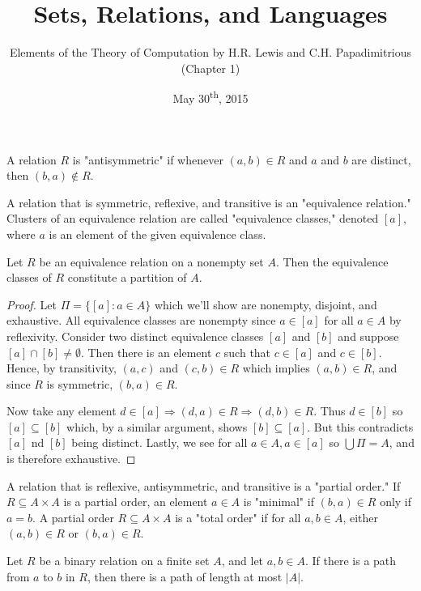 \documentclass[a4paper,11pt]{article}
\title{Sets, Relations, and Languages}
\author{Elements of the Theory of Computation by H.R. Lewis and C.H. Papadimitrious (Chapter 1)}
\date{May 30\textsuperscript{th}, 2015}
\begin{document}
\maketitle
{}

\begin{outline}

    A relation \(R\) is "antisymmetric" if whenever \((a,b)\in R\) and \(a\) and \(b\) are distinct, then
    \((b, a) \not\in R\).
    
    A relation that is symmetric, reflexive, and transitive is an "equivalence relation." Clusters of an
    equivalence relation are called "equivalence classes," denoted \([a]\), where \(a\) is an element of the
    given equivalence class.
    
    Let \(R\) be an equivalence relation on a nonempty set \(A\). Then the equivalence classes of \(R\) constitute
    a partition of \(A\).
    
    \begin{proof}
      Let \(\Pi = \{[a] : a \in A\}\) which we'll show are nonempty, disjoint, and exhaustive. All equivalence classes
      are nonempty since \(a \in [a]\) for all \(a \in A\) by reflexivity. Consider two distinct equivalence classes 
      \([a]\) and \([b]\) and suppose \([a] \cap [b] \neq \emptyset\). Then there is an element \(c\) such that 
      \(c \in [a]\) and \(c \in [b]\). Hence, by transitivity, \((a, c)\) and \((c, b) \in R\) which implies 
      \((a, b) \in R\), and since \(R\) is symmetric, \((b, a) \in R\).
      
      Now take any element \(d \in [a] \Rightarrow (d, a)\in R \Rightarrow (d, b) \in R\). Thus \(d \in [b]\) so 
      \([a] \subseteq [b]\) which, by a similar argument, shows \([b] \subseteq [a]\). But this contradicts
      \([a]\) nd \([b]\) being distinct. Lastly, we see for all \(a \in A, a \in [a]\) so \(\bigcup\Pi = A\),
      and is therefore exhaustive.
    \end{proof}
    
    A relation that is reflexive, antisymmetric, and transitive is a "partial order." If \(R \subseteq A \times A\)
    is a partial order, an element \(a \in A\) is "minimal" if \((b, a)\in R\) only if \(a=b\). A partial order 
    \(R \subseteq A\times A\) is a "total order" if for all \(a, b \in A\), either \((a, b)\in R\) or 
    \((b, a)\in R\).
    
    Let \(R\) be a binary relation on a finite set \(A\), and let \(a, b\in A\). If there is a path from \(a\) to 
    \(b\) in \(R\), then there is a path of length at most \(|A|\).
    

\end{outline}
\end{document}
